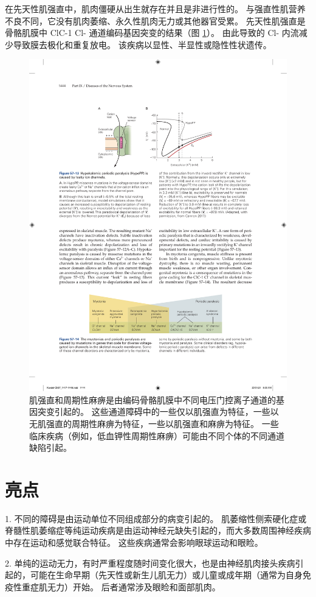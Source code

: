 在先天性肌强直中，肌肉僵硬从出生就存在并且是非进行性的。 与强直性肌营养不良不同，它没有肌肉萎缩、永久性肌肉无力或其他器官受累。 先天性肌强直是骨骼肌膜中 ClC-1 Cl- 通道编码基因突变的结果（图 \ref{fig:57_14}）。 由此导致的 Cl- 内流减少导致膜去极化和重复放电。 该疾病以显性、半显性或隐性性状遗传。

\begin{figure}[htbp]
	\centering
	\includegraphics[width=0.7\linewidth]{chap57/fig_57_14}
	\caption{肌强直和周期性麻痹是由编码骨骼肌膜中不同电压门控离子通道的基因突变引起的。 这些通道障碍中的一些仅以肌强直为特征，一些以无肌强直的周期性麻痹为特征，一些以肌强直和麻痹为特征。 一些临床疾病（例如，低血钾性周期性麻痹）可能由不同个体的不同通道缺陷引起。}
	\label{fig:57_14}
\end{figure}

\section{亮点}

1. 不同的障碍是由运动单位不同组成部分的病变引起的。 肌萎缩性侧索硬化症或脊髓性肌萎缩症等纯运动疾病是由运动神经元缺失引起的，而大多数周围神经疾病中存在运动和感觉联合特征。 这些疾病通常会影响眼球运动和眼睑。 

2. 单纯的运动无力，有时严重程度随时间变化很大，也是由神经肌肉接头疾病引起的，可能在生命早期（先天性或新生儿肌无力）或儿童或成年期（通常为自身免疫性重症肌无力）开始。 后者通常涉及眼睑和面部肌肉。 

